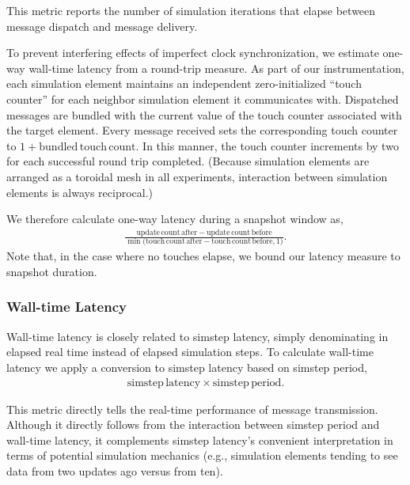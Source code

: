 This metric reports the number of simulation iterations that elapse between message dispatch and message delivery.

To prevent interfering effects of imperfect clock synchronization, we estimate one-way wall-time latency from a round-trip measure.
As part of our instrumentation, each simulation element maintains an independent zero-initialized ``touch counter'' for each neighbor simulation element it communicates with.
Dispatched messages are bundled with the current value of the touch counter associated with the target element.
Every message received sets the corresponding touch counter to $1 + \mathrm{bundled\,touch\,count}$.
In this manner, the touch counter increments by two for each successful round trip completed.
(Because simulation elements are arranged as a toroidal mesh in all experiments, interaction between simulation elements is always reciprocal.)

We therefore calculate one-way latency during a snapshot window as,
\begin{align*}
  \frac{
    \mathrm{update\,count\,after} - \mathrm{update\,count\,before}
  }{
    \min\Big( \mathrm{ touch\,count\,after } - \mathrm{ touch\,count\,before }, 1 \Big)
  }.
\end{align*}
Note that, in the case where no touches elapse, we bound our latency measure to snapshot duration.


\subsubsection{Wall-time Latency} \label{moreno:sec:simulation-time-latency-metric}

Wall-time latency is closely related to simstep latency, simply denominating in elapsed real time instead of elapsed simulation steps.
To calculate wall-time latency we apply a conversion to simstep latency based on simstep period,
\begin{align*}
  \mathrm{simstep\,latency} \times \mathrm{simstep\,period}.
\end{align*}

This metric directly tells the real-time performance of message transmission.
Although it directly follows from the interaction between simstep period and wall-time latency, it complements simstep latency's convenient interpretation in terms of potential simulation mechanics (e.g., simulation elements tending to see data from two updates ago versus from ten).

